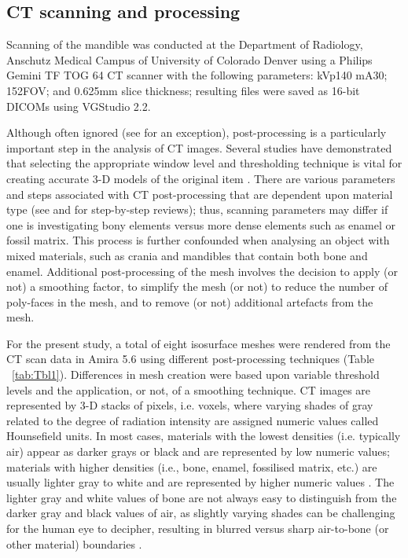 \documentclass[review]{elsarticle}
\begin{document}
\subsection{CT scanning and processing}

Scanning of the mandible was conducted at the Department of Radiology, Anschutz Medical Campus of University of Colorado Denver using a Philips Gemini TF TOG 64 CT scanner with the following parameters: kVp140 mA30; 152FOV; and 0.625mm slice thickness; resulting files were saved as 16-bit DICOMs using VGStudio 2.2. 

Although often ignored (see \citealt{RN8984} for an exception), post-processing is a particularly important step in the analysis of CT images. Several studies have demonstrated that selecting the appropriate window level and thresholding technique is vital for creating accurate 3-D models of the original item \citep{RN11483,RN11485,RN11486}. There are various parameters and steps associated with CT post-processing that are dependent upon material type (see \citealt{RN11484} and \citealt{RN11478} for step-by-step reviews); thus, scanning parameters may differ if one is investigating bony elements versus more dense elements such as enamel or fossil matrix. This process is further confounded when analysing an object with mixed materials, such as crania and mandibles that contain both bone and enamel. Additional post-processing of the mesh involves the decision to apply (or not) a smoothing factor, to simplify the mesh (or not) to reduce the number of poly-faces in the mesh, and to remove (or not) additional artefacts from the mesh. 

For the present study, a total of eight isosurface meshes were rendered from the CT scan data in Amira 5.6 \citep{RN5898} using different post-processing techniques (Table ~\ref{tab:Tbl1}). Differences in mesh creation were based upon variable threshold levels and the application, or not, of a smoothing technique. CT images are represented by 3-D stacks of pixels, i.e. voxels, where varying shades of gray related to the degree of radiation intensity are assigned numeric values called Hounsefield units. In most cases, materials with the lowest densities (i.e. typically air) appear as darker grays or black and are represented by low numeric values; materials with higher densities (i.e., bone, enamel, fossilised matrix, etc.) are usually lighter gray to white and are represented by higher numeric values \citep{RN11484,RN11482}. The lighter gray and white values of bone are not always easy to distinguish from the darker gray and black values of air, as slightly varying shades can be challenging for the human eye to decipher, resulting in blurred versus sharp air-to-bone (or other material) boundaries \citep{RN11478}. 
\end{document}
